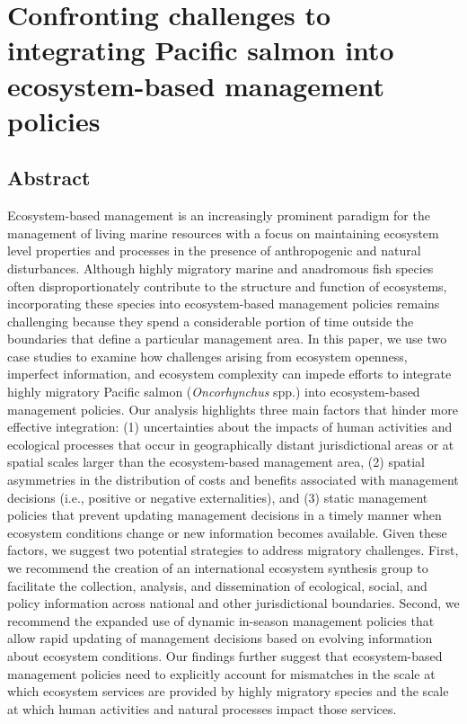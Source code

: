 
\chapter[Integrating salmon into ecosystem-based management
  policies]{Confronting challenges to integrating Pacific salmon into
  ecosystem-based management policies\footnotemark[1]}
\label{ch:ebm}



\section{Abstract}

Ecosystem-based management is an increasingly prominent paradigm for the
management of living marine resources with a focus on maintaining ecosystem
level properties and processes in the presence of anthropogenic and natural
disturbances. Although highly migratory marine and anadromous fish species often
disproportionately contribute to the structure and function of ecosystems,
incorporating these species into ecosystem-based management policies remains
challenging because they spend a considerable portion of time outside the
boundaries that define a particular management area. In this paper, we use two
case studies to examine how challenges arising from ecosystem openness,
imperfect information, and ecosystem complexity can impede efforts to integrate
highly migratory Pacific salmon (\emph{Oncorhynchus} spp.) into ecosystem-based
management policies. Our analysis highlights three main factors that hinder more
effective integration: (1) uncertainties about the impacts of human activities
and ecological processes that occur in geographically distant jurisdictional
areas or at spatial scales larger than the ecosystem-based management area, (2)
spatial asymmetries in the distribution of costs and benefits associated with
management decisions (i.e., positive or negative externalities), and (3) static
management policies that prevent updating management decisions in a timely
manner when ecosystem conditions change or new information becomes available.
Given these factors, we suggest two potential strategies to address migratory
challenges. First, we recommend the creation of an international ecosystem
synthesis group to facilitate the collection, analysis, and dissemination of
ecological, social, and policy information across national and other
jurisdictional boundaries. Second, we recommend the expanded use of dynamic
in-season management policies that allow rapid updating of management decisions
based on evolving information about ecosystem conditions. Our findings further
suggest that ecosystem-based management policies need to explicitly account for
mismatches in the scale at which ecosystem services are provided by highly
migratory species and the scale at which human activities and natural processes
impact those services.



